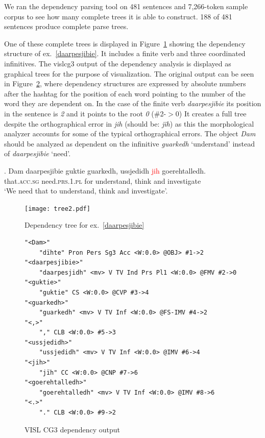 \documentclass[free]{flammie}
\begin{document}
We ran the dependency parsing tool on 481 sentences and 7,266-token sample
corpus to see how many complete trees it is able to construct.  188 of 481
sentences produce complete parse trees.

One of these complete trees is displayed in Figure~\ref{ngoarpam} showing the
dependency structure of ex.~\ref{daarpesjibie}. It includes a finite verb and
three coordinated infinitives.  The vislcg3 output of the dependency analysis is
displayed as graphical trees for the purpose of visualization. The original
output can be seen in Figure~\ref{ngoarpamvislcg3}, where dependency structures
are expressed by absolute numbers after the hashtag for the position of each
word pointing to the number of the word they are dependent on. In the case of
the finite verb \textit{daarpesjibie} its position in the sentence is \textit{2}
and it points to the root \textit{0} (\#2-$>$0) It creates a full tree despite
the orthographical error in \textit{jih} (should be: \textit{jïh}) as this the
morphological analyzer accounts for some of the typical orthographical errors.
The object \textit{Dam} should be analyzed as dependent on the infinitive
\textit{guarkedh} `understand' instead of \textit{daarpesjibie} `need'.


\exg. Dam daarpesjibie guktie guarkedh, ussjedidh \textcolor{red}{jih} goerehtalledh.\label{daarpesjibie}\\
that\textsc{.acc.sg} need\textsc{.prs.1.pl} for  understand, think and investigate\\
`We need that to understand, think and investigate'.



\begin{figure}
\centering
    \texttt{[image: tree2.pdf]}
    \caption{Dependency tree for ex.~\ref{daarpesjibie}\label{ngoarpam}}
\end{figure}


\begin{figure}
\scriptsize
   \begin{verbatim}
"<Dam>"
    "dïhte" Pron Pers Sg3 Acc <W:0.0> @OBJ> #1->2
"<daarpesjibie>"
    "daarpesjidh" <mv> V TV Ind Prs Pl1 <W:0.0> @FMV #2->0
"<guktie>"
    "guktie" CS <W:0.0> @CVP #3->4
"<guarkedh>"
    "guarkedh" <mv> V TV Inf <W:0.0> @FS-IMV #4->2
"<,>"
    "," CLB <W:0.0> #5->3
"<ussjedidh>"
    "ussjedidh" <mv> V TV Inf <W:0.0> @IMV #6->4
"<jih>"
    "jïh" CC <W:0.0> @CNP #7->6
"<goerehtalledh>"
    "goerehtalledh" <mv> V TV Inf <W:0.0> @IMV #8->6
"<.>"
    "." CLB <W:0.0> #9->2\end{verbatim}
   \caption{VISL CG3 dependency output\label{ngoarpamvislcg3}}
\end{figure}
\end{document}
